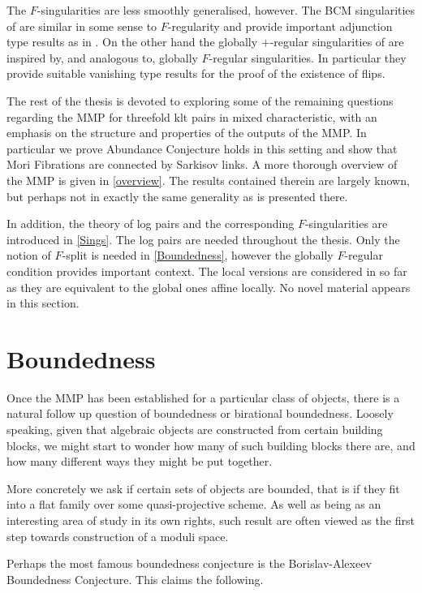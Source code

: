 \documentclass[a4paper,12pt]{book}
\let \OldSection \section
\renewcommand{\section}[1]{\OldSection{#1} \thispagestyle{section}}
\begin{document}
	The $F$-singularities are less smoothly generalised, however. The BCM singularities of \cite{ma2021singularities} are similar in some sense to $F$-regularity and provide important adjunction type results as in \cite{ma2019analog}. On the other hand the globally $+$-regular singularities of \cite{bhatt2020} are inspired by, and analogous to, globally $F$-regular singularities. In particular they provide suitable vanishing type results for the proof of the existence of flips. 
	
	The rest of the thesis is devoted to exploring some of the remaining questions regarding the MMP for threefold klt pairs in mixed characteristic, with an emphasis on the structure and properties of the outputs of the MMP. In particular we prove Abundance Conjecture holds in this setting and show that Mori Fibrations are connected by Sarkisov links. A more thorough overview of the MMP is given in \autoref{overview}. The results contained therein are largely known, but perhaps not in exactly the same generality as is presented there.
	
	In addition, the theory of log pairs and the corresponding $F$-singularities are introduced in \autoref{Sings}. The log pairs are needed throughout the thesis. Only the notion of $F$-split is needed in \autoref{Boundedness}, however the globally $F$-regular condition provides important context. The local versions are considered in so far as they are equivalent to the global ones affine locally. No novel material appears in this section.
	
	\section{Boundedness}
	
	Once the MMP has been established for a particular class of objects, there is a natural follow up question of boundedness or birational boundedness. Loosely speaking, given that algebraic objects are constructed from certain building blocks, we might start to wonder how many of such building blocks there are, and how many different ways they might be put together.
	
	More concretely we ask if certain sets of objects are bounded, that is if they fit into a flat family over some quasi-projective scheme. As well as being as an interesting area of study in its own rights, such result are often viewed as the first step towards construction of a moduli space.
	
	Perhaps the most famous boundedness conjecture is the Borislav-Alexeev Boundedness Conjecture. This claims the following.
	
\end{document}
